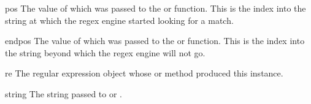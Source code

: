 \begin{memberdesc}[MatchObject]{pos}
The value of  which was passed to the
 or  function.  This is the index into
the string at which the regex engine started looking for a match. 
\end{memberdesc}

\begin{memberdesc}[MatchObject]{endpos}
The value of  which was passed to the
 or  function.  This is the index into
the string beyond which the regex engine will not go.
\end{memberdesc}

\begin{memberdesc}[MatchObject]{re}
The regular expression object whose  or
 method produced this  instance.
\end{memberdesc}

\begin{memberdesc}[MatchObject]{string}
The string passed to  or .
\end{memberdesc}

\begin{seealso}
\end{seealso}

